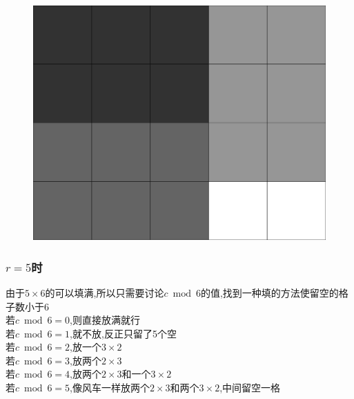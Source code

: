 \documentclass{beamer}
\begin{document}
\begin{frame}
\begin{figure}[htbp]
\begin{minipage}[t]{0.48\textwidth}
					\end{minipage}
					\begin{minipage}[t]{0.48\textwidth}
						\centering
						\includegraphics[height=0.5\textwidth]{pictures/3-4.png}
					\end{minipage}
				\end{figure}

			\end{frame}
			\begin{frame}\frametitle{$r=5$时}
				由于$5\times6$的可以填满,所以只需要讨论$c\bmod6$的值,找到一种填的方法使留空的格子数小于6\\
				若$c\bmod6=0$,则直接放满就行\\
				若$c\bmod6=1$,就不放,反正只留了5个空\\
				若$c\bmod6=2$,放一个$3\times2$\\
				若$c\bmod6=3$,放两个$2\times3$\\
				若$c\bmod6=4$,放两个$2\times3$和一个$3\times2$\\
				若$c\bmod6=5$,像风车一样放两个$2\times3$和两个$3\times2$,中间留空一格\\
			\end{frame}
\end{document}

